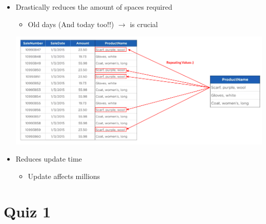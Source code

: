\documentclass[12pt]{article}
\begin{document}
\begin{itemize}
    \item Drastically reduces the amount of spaces required
    \begin{itemize}
        \item Old days (And today too!!) $\to$ is crucial
    \end{itemize}

    \begin{center}
    \includegraphics[width=0.8\linewidth]{images/part_1_notes_1.png}
    \end{center}
    \item Reduces update time
    \begin{itemize}
        \item Update affects millions
    \end{itemize}
\end{itemize}

\bigskip

\section{Quiz 1}

\bigskip
\end{document}
